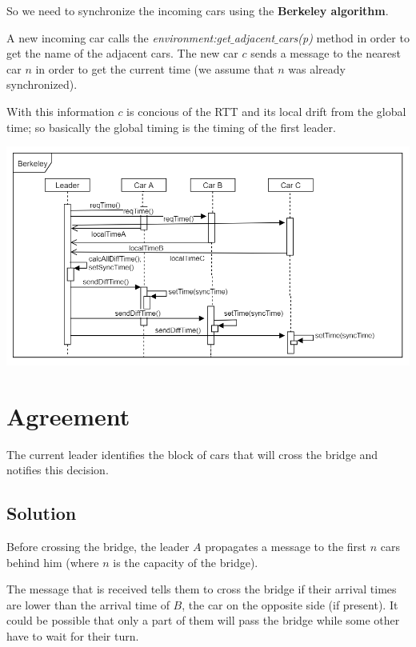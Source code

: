 So we need to synchronize the incoming cars using the \textbf{Berkeley algorithm}.

A new incoming car calls the \textit{environment:get$\_$adjacent$\_$cars(p)} 
method in order to get the name of the adjacent cars. 
The new car $c$ sends a message to the nearest car $n$ in order to get the current time 
(we assume that $n$ was already synchronized). 

With this information $c$ is concious of the RTT and its local drift from the global time;
so basically the global timing is the timing of the first leader. 

\begin{center}
    \includegraphics[scale=0.6, width=\linewidth]{assets/berkeley.png}
\end{center}


\section{Agreement}

The current leader identifies the block of cars that will cross the bridge and notifies
this decision.  

\subsection{Solution}

Before crossing the bridge, the leader $A$ propagates a message to 
the first $n$ cars behind him (where $n$ is the capacity of the bridge). 

The message that is received 
tells them to cross the bridge if their arrival times are lower than the 
arrival time of $B$, the car on the opposite side (if present). It could be possible that only a part
of them will pass the bridge while some other have to wait for their turn.

